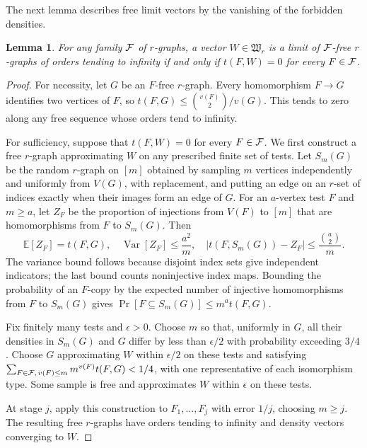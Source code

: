 \documentclass[10pt]{article}
\numberwithin{equation}{section}
\newtheorem{lemma}[lemma]{Lemma}\aliascntresetthe{lemma}
\theoremstyle{definition}
\begin{document}
The next lemma describes free limit vectors by the vanishing of the forbidden densities.
\begin{lemma}\label{lem:freerealization}
For any family $\mathcal F$ of $r$-graphs, a vector $W\in\mathfrak W_r$ is a limit of $\mathcal F$-free $r$-graphs of orders tending to infinity if and only if $t(F,W)=0$ for every $F\in\mathcal F$.
\end{lemma}
\begin{proof}
For necessity, let $G$ be an $F$-free $r$-graph. Every homomorphism $F\to G$ identifies two vertices of $F$, so $t(F,G)\le\binom{v(F)}2/v(G)$. This tends to zero along any free sequence whose orders tend to infinity.

For sufficiency, suppose that $t(F,W)=0$ for every $F\in\mathcal F$. We first construct a free $r$-graph approximating $W$ on any prescribed finite set of tests. Let $S_m(G)$ be the random $r$-graph on $[m]$ obtained by sampling $m$ vertices independently and uniformly from $V(G)$, with replacement, and putting an edge on an $r$-set of indices exactly when their images form an edge of $G$. For an $a$-vertex test $F$ and $m\ge a$, let $Z_F$ be the proportion of injections from $V(F)$ to $[m]$ that are homomorphisms from $F$ to $S_m(G)$. Then
\[
 \mathbb E[Z_F]=t(F,G),\quad
 \operatorname{Var}[Z_F]\le \frac{a^2}{m},\quad
 |t(F,S_m(G))-Z_F|\le\frac{\binom a2}{m}.
\]
The variance bound follows because disjoint index sets give independent indicators; the last bound counts noninjective index maps. Bounding the probability of an $F$-copy by the expected number of injective homomorphisms from $F$ to $S_m(G)$ gives $\Pr[F\subseteq S_m(G)]\le m^a t(F,G)$.

Fix finitely many tests and $\epsilon>0$. Choose $m$ so that, uniformly in $G$, all their densities in $S_m(G)$ and $G$ differ by less than $\epsilon/2$ with probability exceeding $3/4$. Choose $G$ approximating $W$ within $\epsilon/2$ on these tests and satisfying $\sum_{F\in\mathcal F,\,v(F)\le m}m^{v(F)}t(F,G)<1/4$, with one representative of each isomorphism type. Some sample is free and approximates $W$ within $\epsilon$ on these tests.

At stage $j$, apply this construction to $F_1,\ldots,F_j$ with error $1/j$, choosing $m\ge j$. The resulting free $r$-graphs have orders tending to infinity and density vectors converging to $W$.
\end{proof}
\end{document}
